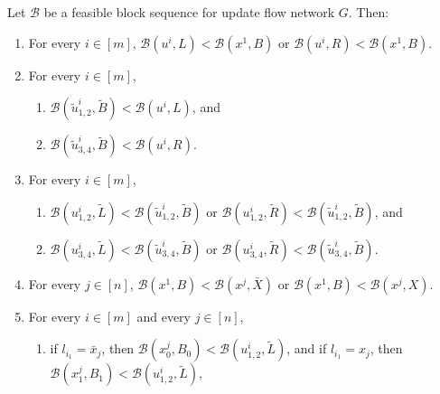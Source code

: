 \documentclass[fontsize=11pt,paper=a4]{book}
\begin{document}
\begin{lem}
Let \(\mathcal{B}\) be a feasible block sequence for update flow network \(G\). Then:

\begin{enumerate}
\item \label{itm:lem-feasible-block-sequence-properties-1}
For every \(i\in[m]\), \(\mathcal{B}(u^i,L)<\mathcal{B}(x^1,B)\) or \(\mathcal{B}(u^i,R)<\mathcal{B}(x^1,B)\).

\item \label{itm:lem-feasible-block-sequence-properties-2}
For every \(i\in[m]\),

\begin{enumerate}
\item \label{itm:lem-feasible-block-sequence-properties-2-1}
\(\mathcal{B}(\tilde{u}_{1,2}^i,\tilde{B})<\mathcal{B}(u^i,L)\), and

\item \label{itm:lem-feasible-block-sequence-properties-2-2}
\(\mathcal{B}(\tilde{u}_{3,4}^i,\tilde{B})<\mathcal{B}(u^i,R)\).
\end{enumerate}

\item \label{itm:lem-feasible-block-sequence-properties-3}
For every \(i\in[m]\),

\begin{enumerate}
\item \label{itm:lem-feasible-block-sequence-properties-3-1}
\(\mathcal{B}(u_{1,2}^i,\tilde{L})<\mathcal{B}(\tilde{u}_{1,2}^i,\tilde{B})\) or \(\mathcal{B}(u_{1,2}^i,\tilde{R})<\mathcal{B}(\tilde{u}_{1,2}^i,\tilde{B})\), and

\item \label{itm:lem-feasible-block-sequence-properties-3-2}
\(\mathcal{B}(u_{3,4}^i,\tilde{L})<\mathcal{B}(\tilde{u}_{3,4}^i,\tilde{B})\) or \(\mathcal{B}(u_{3,4}^i,\tilde{R})<\mathcal{B}(\tilde{u}_{3,4}^i,\tilde{B})\).
\end{enumerate}

\item \label{itm:lem-feasible-block-sequence-properties-4}
For every \(j\in[n]\), \(\mathcal{B}(x^1,B)<\mathcal{B}(x^j,\bar{X})\) or \(\mathcal{B}(x^1,B)<\mathcal{B}(x^j,X)\).

\item \label{itm:lem-feasible-block-sequence-properties-5}
For every \(i\in[m]\) and every \(j\in[n]\),

\begin{enumerate}
\item \label{itm:lem-feasible-block-sequence-properties-5-1}
if \(l_{i_1}=\bar{x}_j\), then \(\mathcal{B}(x_0^j,B_0)<\mathcal{B}(u_{1,2}^i,\tilde{L})\), and if \(l_{i_1}=x_j\), then \(\mathcal{B}(x_1^j,B_1)<\mathcal{B}(u_{1,2}^i,\tilde{L})\),


\end{enumerate}
\end{enumerate}
\end{lem}
\end{document}
